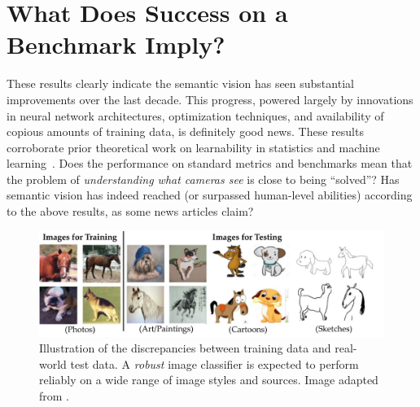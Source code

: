 


\section{What Does Success on a Benchmark Imply?}
These results clearly indicate the semantic vision has seen substantial improvements over the last decade.
This progress, powered largely by innovations in neural network architectures, optimization techniques, and availability of copious amounts of training data, is definitely good news.
These results corroborate prior theoretical work on learnability in statistics and machine learning~\citep{valiant1984theory,hoeffding1994probability,hornik1989multilayer}.
Does the performance on standard metrics and benchmarks mean that the problem of \textit{understanding what cameras see} is close to being ``solved''?
Has semantic vision has indeed reached (or surpassed human-level abilities) according to the above results, as some news articles claim?

\begin{figure}
    \centering
    \includegraphics[width=\linewidth]{figures/pacs_styles.pdf}
    \caption{Illustration of the discrepancies between training data and real-world test data. A \textit{robust} image classifier is expected to perform reliably on a wide range of image styles and sources.
    Image adapted from \citet{li2017deeper}.
    }
    \label{fig:pacs_styles_introduction}
\end{figure}

